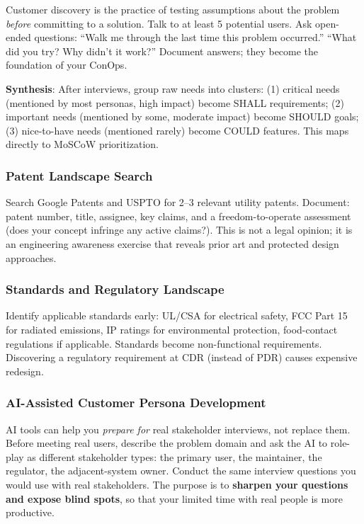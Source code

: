 Customer discovery is the practice of testing assumptions about the problem \emph{before} committing to a solution. Talk to at least 5 potential users. Ask open-ended questions: ``Walk me through the last time this problem occurred.'' ``What did you try? Why didn't it work?'' Document answers; they become the foundation of your ConOps.

\textbf{Synthesis}: After interviews, group raw needs into clusters: (1) critical needs (mentioned by most personas, high impact) become SHALL requirements; (2) important needs (mentioned by some, moderate impact) become SHOULD goals; (3) nice-to-have needs (mentioned rarely) become COULD features. This maps directly to MoSCoW prioritization.


\subsubsection{Patent Landscape Search}
Search Google Patents and USPTO for 2--3 relevant utility patents. Document: patent number, title, assignee, key claims, and a freedom-to-operate assessment (does your concept infringe any active claims?). This is not a legal opinion; it is an engineering awareness exercise that reveals prior art and protected design approaches.

\subsubsection{Standards and Regulatory Landscape}
Identify applicable standards early: UL/CSA for electrical safety, FCC Part 15 for radiated emissions, IP ratings for environmental protection, food-contact regulations if applicable. Standards become non-functional requirements. Discovering a regulatory requirement at CDR (instead of PDR) causes expensive redesign.

\subsubsection{AI-Assisted Customer Persona Development}
AI tools can help you \emph{prepare for} real stakeholder interviews, not replace them. Before meeting real users, describe the problem domain and ask the AI to role-play as different stakeholder types: the primary user, the maintainer, the regulator, the adjacent-system owner. Conduct the same interview questions you would use with real stakeholders. The purpose is to \textbf{sharpen your questions and expose blind spots}, so that your limited time with real people is more productive.

